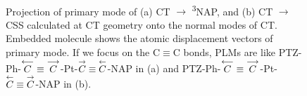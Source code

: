 \begin{figure}[!h]
\\
\caption{
Projection of primary mode of (a) CT $\rightarrow$ \textsuperscript{3}NAP, and (b) CT $\rightarrow$ CSS calculated at CT geometry onto the normal modes of CT. Embedded molecule shows the atomic displacement vectors of primary mode. If we focus on the C$\equiv$C bonds, PLMs are like
PTZ-Ph-$\protect\overset{\longleftarrow}{C}\equiv\protect\overset{\longrightarrow}{C}$-Pt-$\protect\overset{\rightarrow}{C}\equiv\protect\overset{\leftarrow}{C}$-NAP
in (a) and
PTZ-Ph-$\protect\overset{\longleftarrow}{C}\equiv\protect\overset{\longrightarrow}{C}$-Pt-$\protect\overset{\leftarrow}{C}\equiv\protect\overset{\rightarrow}{C}$-NAP
in (b).
}\label{projT3}
\end{figure}


